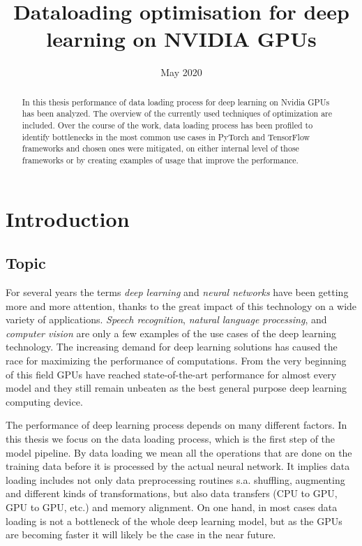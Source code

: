 \documentclass[licencjacka,en]{pracamgr}
\title{Dataloading optimisation for deep learning on NVIDIA GPUs}
\date{May 2020}
\begin{document}
\maketitle

\begin{abstract}

In this thesis performance of data loading process for deep learning on Nvidia GPUs has been analyzed. The overview of the currently used techniques of optimization are included. Over the course of the work, data loading process has been profiled to identify bottlenecks in the most common use cases in PyTorch and TensorFlow frameworks and chosen ones were mitigated, on either internal level of those frameworks or by creating examples of usage that improve the performance.

\end{abstract}

\tableofcontents

\chapter*{Introduction}

\section*{Topic}

For several years the terms \emph{deep learning} and \emph{neural networks} have been getting more and more attention, thanks to the great impact of this technology on a wide variety of applications. \emph{Speech recognition}, \emph{natural language processing}, and \emph{computer vision} are only a few examples of the use cases of the deep learning technology. The increasing demand for deep learning solutions has caused the race for maximizing the performance of computations. From the very beginning of this field GPUs have reached state-of-the-art performance for almost every model and they still remain unbeaten as the best general purpose deep learning computing device.

The performance of deep learning process depends on many different factors. In this thesis we focus on the data loading process, which is the first step of the model pipeline. By data loading we mean all the operations that are done on the training data before it is processed by the actual neural network. It implies data loading includes not only data preprocessing routines s.a. shuffling, augmenting and different kinds of transformations, but also data transfers (CPU to GPU, GPU to GPU, etc.) and memory alignment. On one hand, in most cases data loading is not a bottleneck of the whole deep learning model, but as the GPUs are becoming faster it will likely be the case in the near future.
\end{document}
